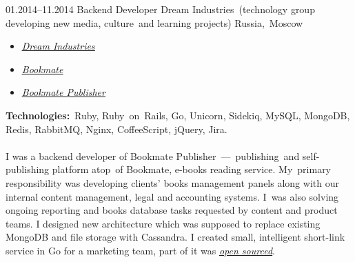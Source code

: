 \documentclass[12pt,a4paper,final]{moderncv}
\begin{document}
\cventry
{01.2014--11.2014}
{Backend Developer}
{Dream Industries~(technology group developing new media, culture~and learning projects)}
{Russia,~Moscow}
{}
{
  \begin{itemize}
    \item \underline{\href{http://dreamindustries.co/}{\itshape Dream Industries}}
    \item \underline{\href{http://bookmate.com/}{\itshape Bookmate}}
    \item \underline{\href{http://publisher.bookmate.com/}{\itshape Bookmate Publisher}}
  \end{itemize}
  \textbf{Technologies:}~Ruby, Ruby~on~Rails, Go, Unicorn, Sidekiq, MySQL, MongoDB, Redis, RabbitMQ, Nginx, CoffeeScript, jQuery, Jira.
  \\\\
  I was a backend developer of Bookmate Publisher~---~publishing~and self-publishing platform atop~of Bookmate, e-books reading service. My~primary responsibility was developing clients' books management panels along with our internal content management, legal and accounting systems. I~was also solving ongoing reporting and books database tasks requested by content and product teams. I designed new architecture which was supposed to replace existing MongoDB and file storage with Cassandra. I created small, intelligent short-link service in Go for a marketing team, part of it was \underline{\href{https://github.com/kavu/cappa}{\itshape open sourced}}.
}
\end{document}
